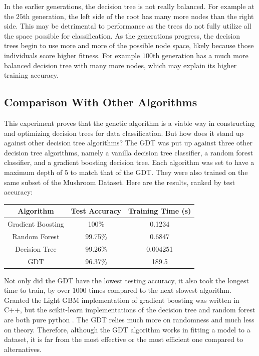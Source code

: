 \documentclass[12pt]{article}
\begin{document}
In the earlier generations, the decision tree is not really balanced. For example at the $25$th generation, the left side of the root has many more nodes than the right side. This may be detrimental to performance as the trees do not fully utilize all the space possible for classification. As the generations progress, the decision trees begin to use more and more of the possible node space, likely because those individuals score higher fitness. For example $100$th generation has a much more balanced decision tree with many more nodes, which may explain its higher training accuracy.

\subsection{Comparison With Other Algorithms}

This experiment proves that the genetic algorithm is a viable way in constructing and optimizing decision trees for data classification. But how does it stand up against other decision tree algorithms? The GDT was put up against three other decision tree algorithms, namely a vanilla decision tree classifier, a random forest classifier, and a gradient boosting decision tree. Each algorithm was set to have a maximum depth of $5$ to match that of the GDT. They were also trained on the same subset of the Mushroom Dataset. Here are the results, ranked by test accuracy:

\begin{center}
    \begin{tabular}{|c|c|c|}
        \hline
        Algorithm & Test Accuracy & Training Time (s) \\
        \hline \hline
        Gradient Boosting & 100\% & 0.1234 \\
        \hline
        Random Forest & 99.75\% & 0.6847 \\
        \hline
        Decision Tree & 99.26\% & 0.004251 \\
        \hline
        GDT & 96.37\% & 189.5 \\
        \hline
    \end{tabular}
\end{center}

Not only did the GDT have the lowest testing accuracy, it also took the longest time to train, by over $1000$ times compared to the next slowest algorithm. Granted the Light GBM \autocite{ke2017lightgbm} implementation of gradient boosting was written in C++, but the scikit-learn implementations of the decision tree and random forest are both pure python \autocite{scikit-learn}. The GDT relies much more on randomness and much less on theory. Therefore, although the GDT algorithm works in fitting a model to a dataset, it is far from the most effective or the most efficient one compared to alternatives.
\end{document}
